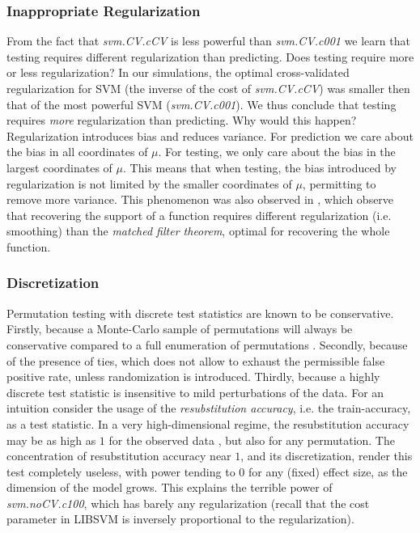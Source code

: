 \documentclass[]{bio}
\begin{document}
\subsubsection{Inappropriate Regularization}
From the fact that \emph{svm.CV.cCV} is less powerful than \emph{svm.CV.c001} we learn that testing requires different regularization than predicting.
Does testing require more or less regularization?
In our simulations, the optimal cross-validated regularization for SVM (the inverse of the cost of \emph{svm.CV.cCV}) was smaller then that of the most powerful SVM (\emph{svm.CV.c001}).
We thus conclude that testing requires \emph{more} regularization  than predicting. 
Why would this happen?
Regularization introduces bias and reduces variance. 
For prediction we care about the bias in all coordinates of $\mu$. 
For testing, we only care about the bias in the largest coordinates of $\mu$. 
This means that when testing, the bias introduced by regularization is not limited by the smaller coordinates of $\mu$, permitting to remove more variance. 
This phenomenon was also observed in \cite{cheng2017multiple}, which observe that recovering the support of a function requires different regularization (i.e. smoothing) than the \emph{matched filter theorem}, optimal for recovering the whole function.


\subsubsection{Discretization}
Permutation testing with discrete test statistics are known to be conservative.
Firstly, because a Monte-Carlo sample of permutations will always be conservative compared to a full enumeration of permutations \citep{hemerik_exact_2014}.
Secondly, because of the presence of ties, which does not allow to exhaust the permissible false positive rate, unless randomization is introduced.
Thirdly, because a highly discrete test statistic is insensitive to mild perturbations of the data.
For an intuition consider the usage of the \emph{resubstitution accuracy}, i.e. the train-accuracy, as a test statistic. 
In a very high-dimensional regime, the resubstitution accuracy may be as high as $1$ for the observed data \cite[Theorem 1]{mclachlan_bias_1976}, but also for any permutation.
The concentration of resubstitution accuracy near $1$, and its discretization, render this test completely useless, with power tending to $0$ for any (fixed) effect size, as the dimension of the model grows. 
This explains the terrible power of \emph{svm.noCV.c100}, which has barely any regularization (recall that the cost parameter in LIBSVM is inversely proportional to the regularization). 
\end{document}
